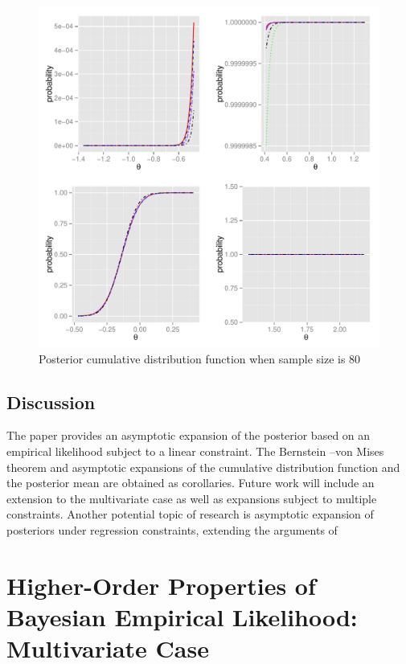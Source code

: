 \documentclass[oneside,english]{amsbook}
\numberwithin{section}{chapter}
\numberwithin{equation}{section}
\numberwithin{figure}{section}
\theoremstyle{plain}
\theoremstyle{plain}
\theoremstyle{definition}
\theoremstyle{plain}
\theoremstyle{plain}
\theoremstyle{remark}
\theoremstyle{definition}
\theoremstyle{definition}
\begin{document}
\begin{figure}[H]

\begin{center}
\includegraphics[scale=0.5]{n80bw.pdf}\protect\caption{Posterior cumulative distribution function when sample size is 80\label{fig:Posterior-CDF-n80}}
\end{center}

\end{figure}
 
\section{Discussion}
The paper provides an asymptotic expansion of the posterior based on an empirical likelihood subject to a linear constraint. The Bernstein --von Mises theorem and asymptotic expansions of the cumulative distribution function and the posterior mean are obtained as corollaries. Future work will include an extension to the multivariate case as well as expansions subject to multiple constraints. Another potential topic of research is asymptotic expansion of posteriors under regression constraints, extending the arguments of \cite{ghosal1999asymptotic,ghosal2000asymptotic}


\chapter{Higher-Order Properties of Bayesian Empirical Likelihood: Multivariate
Case}
\end{document}
